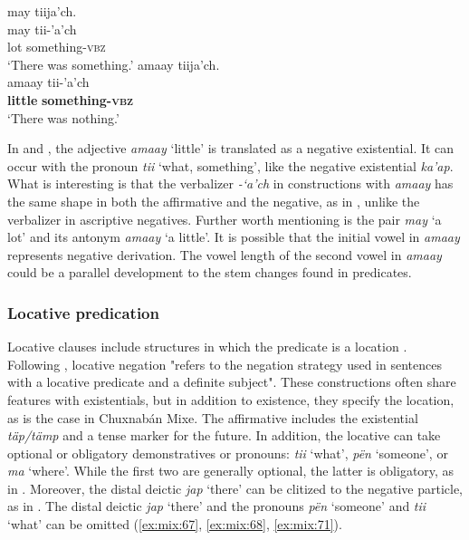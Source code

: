 \documentclass[output=paper,colorlinks,citecolor=brown,draft]{langscibook}
\begin{document}
\ea\label{ex:mix:66}
    \ea\label{ex:mix:66a}
        \glll may tiija’ch.\\ 
              may tii-’a’ch\\
              lot something-\textsc{vbz} \\
        \glt ‘There was something.’ 
    \ex\label{ex:mix:66b}
        \glll amaay tiija’ch.\\
              amaay tii-’a’ch\\
             \textbf{little} \textbf{something-\textsc{vbz}} \\
        \glt ‘There was nothing.’
    \z
\z 

In  and , the adjective \textit{amaay} ‘little’ is translated as a negative existential. It can occur with the pronoun \textit{tii} ‘what, something’, like the negative existential \textit{ka’ap}. What is interesting is that the verbalizer \textit{{}-‘a’ch} in constructions with \textit{amaay} has the same shape in both the affirmative and the negative, as in , unlike the verbalizer in ascriptive negatives. Further worth mentioning is the pair \textit{may} ‘a lot’ and its antonym \textit{amaay} ‘a little’. It is possible that the initial vowel in \textit{amaay} represents negative derivation. The vowel length of the second vowel in \textit{amaay} could be a parallel development to the stem changes found in predicates. 

\subsubsection{Locative predication}\label{sec:mix:2.3.5}

Locative clauses include structures in which the predicate is a location \citep[112]{Payne1997}. Following \citet[110]{Veselinova2013neg.exist}, locative negation "refers to the negation strategy used in sentences with a locative predicate and a definite subject". These constructions often share features with existentials, but in addition to existence, they specify the location, as is the case in Chuxnabán Mixe. The affirmative includes the existential \textit{täp/tämp} and a tense marker for the future. In addition, the locative can take optional or obligatory demonstratives or pronouns: \textit{tii} ‘what’, \textit{pën} ‘someone’, or \textit{ma} ‘where’. While the first two are generally optional, the latter is obligatory, as in . Moreover, the distal deictic \textit{jap} ‘there’ can be clitized to the negative particle, as in . The distal deictic \textit{jap} ‘there’ and the pronouns \textit{pën} ‘someone’ and \textit{tii} ‘what’ can be omitted (\ref{ex:mix:67}, \ref{ex:mix:68}, \ref{ex:mix:71}). 
\end{document}
